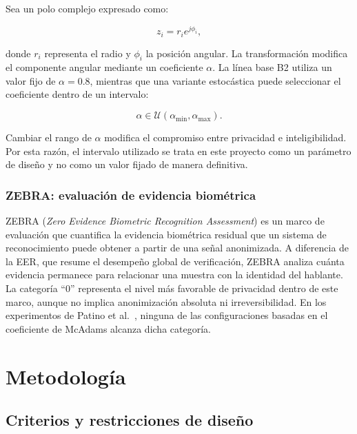 \documentclass[10pt,twocolumn]{article}
\begin{document}
Sea un polo complejo expresado como:

\begin{equation}
    z_i = r_i e^{j\phi_i},
\end{equation}

donde $r_i$ representa el radio y $\phi_i$ la posición angular. La
transformación modifica el componente angular mediante un coeficiente
$\alpha$. La línea base B2 utiliza un valor fijo de $\alpha=0.8$, mientras que
una variante estocástica puede seleccionar el coeficiente dentro de un
intervalo:

\begin{equation}
    \alpha \in
    \mathcal{U}
    \left(
        \alpha_{\min},
        \alpha_{\max}
    \right).
\end{equation}

Cambiar el rango de $\alpha$ modifica el compromiso entre privacidad e
inteligibilidad. Por esta razón, el intervalo utilizado se trata en este
proyecto como un parámetro de diseño y no como un valor fijado de manera
definitiva.

\subsubsection{ZEBRA: evaluación de evidencia biométrica}

ZEBRA (\textit{Zero Evidence Biometric Recognition Assessment}) es un marco de
evaluación que cuantifica la evidencia biométrica residual que un sistema de
reconocimiento puede obtener a partir de una señal anonimizada. A diferencia de
la EER, que resume el desempeño global de verificación, ZEBRA analiza cuánta
evidencia permanece para relacionar una muestra con la identidad del hablante.
La categoría ``0'' representa el nivel más favorable de privacidad dentro de
este marco, aunque no implica anonimización absoluta ni irreversibilidad. En
los experimentos de Patino et al.~\cite{patino2021}, ninguna de las
configuraciones basadas en el coeficiente de McAdams alcanza dicha categoría.


\section{Metodología}

\subsection{Criterios y restricciones de diseño}
\end{document}
